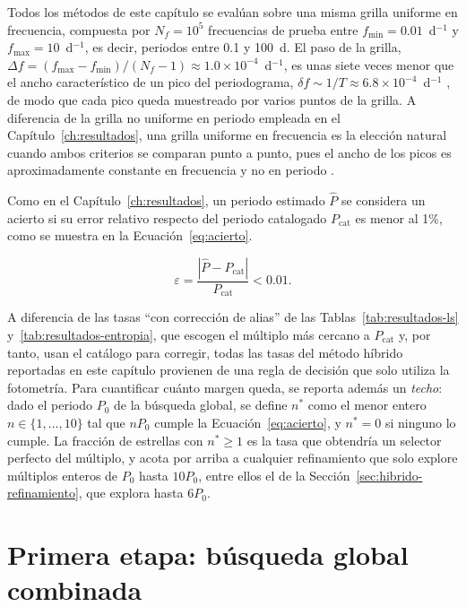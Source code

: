\documentclass[12pt,letterpaper,oneside]{book}
\begin{document}
Todos los m\'etodos de este cap\'itulo se eval\'uan sobre una misma grilla uniforme en frecuencia, compuesta por $N_f=10^5$ frecuencias de prueba entre $f_{\mathrm{min}}=0.01$~d$^{-1}$ y $f_{\mathrm{max}}=10$~d$^{-1}$, es decir, periodos entre 0.1 y 100~d. El paso de la grilla, $\Delta f=(f_{\mathrm{max}}-f_{\mathrm{min}})/(N_f-1)\approx1.0\times10^{-4}$~d$^{-1}$, es unas siete veces menor que el ancho caracter\'istico de un pico del periodograma, $\delta f\sim1/T\approx6.8\times10^{-4}$~d$^{-1}$ \citep{VanderPlas2018}, de modo que cada pico queda muestreado por varios puntos de la grilla. A diferencia de la grilla no uniforme en periodo empleada en el Cap\'itulo~\ref{ch:resultados}, una grilla uniforme en frecuencia es la elecci\'on natural cuando ambos criterios se comparan punto a punto, pues el ancho de los picos es aproximadamente constante en frecuencia y no en periodo \citep{VanderPlas2018}.

Como en el Cap\'itulo~\ref{ch:resultados}, un periodo estimado $\hat P$ se considera un acierto si su error relativo respecto del periodo catalogado $P_{\mathrm{cat}}$ es menor al 1\%, como se muestra en la Ecuaci\'on~\eqref{eq:acierto}.

\begin{equation}
	\varepsilon = \frac{|\hat P - P_{\mathrm{cat}}|}{P_{\mathrm{cat}}} < 0.01.
	\label{eq:acierto}
\end{equation}

A diferencia de las tasas ``con correcci\'on de alias'' de las Tablas~\ref{tab:resultados-ls} y~\ref{tab:resultados-entropia}, que escogen el m\'ultiplo m\'as cercano a $P_{\mathrm{cat}}$ y, por tanto, usan el cat\'alogo para corregir, todas las tasas del m\'etodo h\'ibrido reportadas en este cap\'itulo provienen de una regla de decisi\'on que solo utiliza la fotometr\'ia. Para cuantificar cu\'anto margen queda, se reporta adem\'as un \emph{techo}: dado el periodo $P_0$ de la b\'usqueda global, se define $n^\ast$ como el menor entero $n\in\{1,\dots,10\}$ tal que $nP_0$ cumple la Ecuaci\'on~\eqref{eq:acierto}, y $n^\ast=0$ si ninguno lo cumple. La fracci\'on de estrellas con $n^\ast\geq1$ es la tasa que obtendr\'ia un selector perfecto del m\'ultiplo, y acota por arriba a cualquier refinamiento que solo explore m\'ultiplos enteros de $P_0$ hasta $10P_0$, entre ellos el de la Secci\'on~\ref{sec:hibrido-refinamiento}, que explora hasta $6P_0$.

\section{Primera etapa: b\'usqueda global combinada}
\label{sec:hibrido-busqueda}
\end{document}
